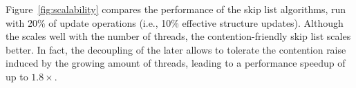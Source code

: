 Figure~\ref{fig:scalability} compares the performance of the skip list algorithms, run with 20\% of 
update operations (i.e., 10\% effective structure updates). 
Although the  scales well with the number of threads, the contention-friendly skip list scales better. In fact, the decoupling of the later allows to tolerate the contention raise 
induced by the growing amount of threads, leading to a performance speedup of up to $1.8\times$.






